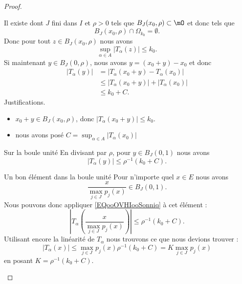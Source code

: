 \begin{proof}
\begin{subproof}
    Il existe dont \( J\) fini dans \( I\) et \( \rho>0\) tels que \( B_J(x_0,\rho)\subset \mO\) et donc tels que
    \begin{equation}
        B_J(x_0,\rho)\cap\Omega_{k_0}=\emptyset.
    \end{equation}
    Donc pour tout \( z\in B_J(x_0,\rho)\) nous avons
    \begin{equation}
        \sup_{\alpha\in A}\big| T_{\alpha}(z) \big|\leq k_0.
    \end{equation}
    Si maintenant \( y\in B_J(0,\rho)\), nous avons \( y=(x_0+y)-x_0\) et donc
    \begin{subequations}
        \begin{align}
            \big| T_{\alpha}(y) \big|&=\big| T_{\alpha}(x_0+y)-T_{\alpha}(x_0) \big|\\
            &\leq \big| T_{\alpha}(x_0+y) \big|+\big| T_{\alpha}(x_0) \big|\\
            &\leq k_0+C.
        \end{align}
    \end{subequations}
    Justifications.
    \begin{itemize}
\item
    \( x_0+y\in B_J(x_0,\rho)\), donc \( \big| T_{\alpha}(x_0+y) \big|\leq k_0\).
        \item 
    nous avons posé \( C=\sup_{\alpha\in A}\big| T_{\alpha}(x_0) \big|\)
    \end{itemize}
\item[Sur la boule unité]
    En divisant par \( \rho\), pour \( y\in B_J(0,1)\) nous avons
    \begin{equation}        \label{EQooOVHIooSonniq}
        \big| T_{\alpha}(y) \big|\leq \rho^{-1}(k_0+C).
    \end{equation}
\item[Un bon élément dans la boule unité]
    Pour n'importe quel \( x\in E\) nous avons
    \begin{equation}
        \frac{ x }{ \max_{j\in J}p_j(x) }\in B_J(0,1).
    \end{equation}
    Nous pouvons donc appliquer \eqref{EQooOVHIooSonniq} à cet élément :
    \begin{equation}
        \left| T_{\alpha}\left( \frac{ x }{ \max_{j\in J} p_j(x) } \right) \right| \leq \rho^{-1}(k_0+C).
    \end{equation}
    Utilisant encore la linéarité de \( T_{\alpha}\) nous trouvons ce que nous devions trouver :
    \begin{equation}
        \big| T_{\alpha}(x) \big|\leq \max_{j\in J}p_j(x)\rho^{-1}(k_0+C)=K\max_{j\in J}p_j(x)
    \end{equation}
    en posant \(K= \rho^{-1}(k_0+C)\).
    \end{subproof}
\end{proof}


